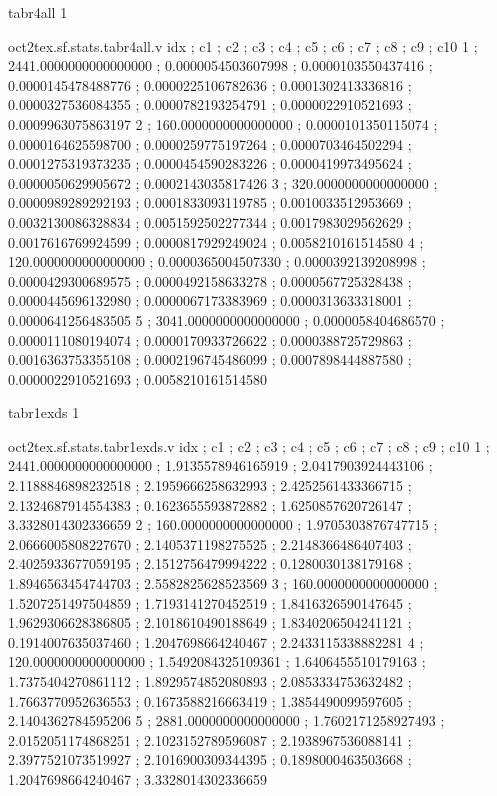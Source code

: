\expandafter\def\csname oct2tex.sf.stats.tabr4all.t\endcsname{tabr4all}
\expandafter\def\csname oct2tex.sf.stats.tabr4all.u\endcsname{1}
\begin{filecontents}[overwrite]{oct2tex.sf.stats.tabr4all.v}
idx ; c1 ; c2 ; c3 ; c4 ; c5 ; c6 ; c7 ; c8 ; c9 ; c10
1 ; 2441.0000000000000000 ; 0.0000054503607998 ; 0.0000103550437416 ; 0.0000145478488776 ; 0.0000225106782636 ; 0.0001302413336816 ; 0.0000327536084355 ; 0.0000782193254791 ; 0.0000022910521693 ; 0.0009963075863197
2 ; 160.0000000000000000 ; 0.0000101350115074 ; 0.0000164625598700 ; 0.0000259775197264 ; 0.0000703464502294 ; 0.0001275319373235 ; 0.0000454590283226 ; 0.0000419973495624 ; 0.0000050629905672 ; 0.0002143035817426
3 ; 320.0000000000000000 ; 0.0000989289292193 ; 0.0001833093119785 ; 0.0010033512953669 ; 0.0032130086328834 ; 0.0051592502277344 ; 0.0017983029562629 ; 0.0017616769924599 ; 0.0000817929249024 ; 0.0058210161514580
4 ; 120.0000000000000000 ; 0.0000365004507330 ; 0.0000392139208998 ; 0.0000429300689575 ; 0.0000492158633278 ; 0.0000567725328438 ; 0.0000445696132980 ; 0.0000067173383969 ; 0.0000313633318001 ; 0.0000641256483505
5 ; 3041.0000000000000000 ; 0.0000058404686570 ; 0.0000111080194074 ; 0.0000170933726622 ; 0.0000388725729863 ; 0.0016363753355108 ; 0.0002196745486099 ; 0.0007898444887580 ; 0.0000022910521693 ; 0.0058210161514580
\end{filecontents}
\expandafter\def\csname oct2tex.sf.stats.tabr1exds.t\endcsname{tabr1exds}
\expandafter\def\csname oct2tex.sf.stats.tabr1exds.u\endcsname{1}
\begin{filecontents}[overwrite]{oct2tex.sf.stats.tabr1exds.v}
idx ; c1 ; c2 ; c3 ; c4 ; c5 ; c6 ; c7 ; c8 ; c9 ; c10
1 ; 2441.0000000000000000 ; 1.9135578946165919 ; 2.0417903924443106 ; 2.1188846898232518 ; 2.1959666258632993 ; 2.4252561433366715 ; 2.1324687914554383 ; 0.1623655593872882 ; 1.6250857620726147 ; 3.3328014302336659
2 ; 160.0000000000000000 ; 1.9705303876747715 ; 2.0666005808227670 ; 2.1405371198275525 ; 2.2148366486407403 ; 2.4025933677059195 ; 2.1512756479994222 ; 0.1280030138179168 ; 1.8946563454744703 ; 2.5582825628523569
3 ; 160.0000000000000000 ; 1.5207251497504859 ; 1.7193141270452519 ; 1.8416326590147645 ; 1.9629306628386805 ; 2.1018610490188649 ; 1.8340206504241121 ; 0.1914007635037460 ; 1.2047698664240467 ; 2.2433115338882281
4 ; 120.0000000000000000 ; 1.5492084325109361 ; 1.6406455510179163 ; 1.7375404270861112 ; 1.8929574852080893 ; 2.0853334753632482 ; 1.7663770952636553 ; 0.1673588216663419 ; 1.3854490099597605 ; 2.1404362784595206
5 ; 2881.0000000000000000 ; 1.7602171258927493 ; 2.0152051174868251 ; 2.1023152789596087 ; 2.1938967536088141 ; 2.3977521073519927 ; 2.1016900309344395 ; 0.1898000463503668 ; 1.2047698664240467 ; 3.3328014302336659
\end{filecontents}
